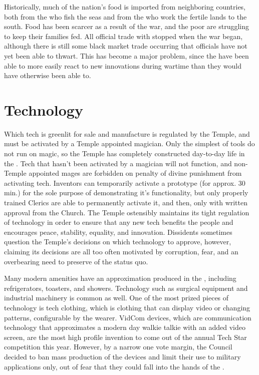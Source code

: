 \documentclass[blue]{GL2020}
\begin{document}
Historically, much of the nation's food is imported from neighboring countries, both from the \pShippies{} who fish the seas and from the \pFarmers{} who work the fertile lands to the south.  Food has been scarcer as a result of the war, and the poor are struggling to keep their families fed.  All official trade with \pShip{} stopped when the war began, although there is still some black market trade occurring that officials have not yet been able to thwart.  This has become a major problem, since the \pShippies{} have been able to more easily react to new \pTech{} innovations during wartime than they would have otherwise been able to.

\section*{Technology}
Which tech is greenlit for sale and manufacture is regulated by the Temple, and must be activated by a Temple appointed magician.  Only the simplest of tools do not run on magic, so the Temple has completely constructed day-to-day life in the \pTech{}.  Tech that hasn't been activated by a magician will not function, and non-Temple appointed mages are forbidden on penalty of divine punishment from activating tech. Inventors can temporarily activate a prototype (for approx. 30 min.) for the sole purpose of demonstrating it's functionality, but only properly trained Clerics are able to permanently activate it, and then, only with written approval from the Church. The Temple ostensibly maintains its tight regulation of technology in order to ensure that any new tech benefits the people and encourages peace, stability, equality, and innovation.  Dissidents sometimes question the Temple's decisions on which technology to approve, however, claiming its decisions are all too often motivated by corruption, fear, and an overbearing need to preserve of the status quo.

Many modern amenities have an approximation produced in the \pTech{}, including refrigerators, toasters, and showers.  Technology such as surgical equipment and industrial machinery is common as well.  One of the most prized pieces of technology is tech clothing, which is clothing that can display video or changing patterns, configurable by the wearer.  VidCom devices, which are communication technology that approximates a modern day walkie talkie with an added video screen, are the most high profile invention to come out of the annual Tech Star competition this year.  However, by a narrow one vote margin, the Council decided to ban mass production of the devices and limit their use to military applications only, out of fear that they could fall into the hands of the \pShippies{}.
\end{document}
